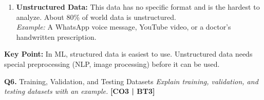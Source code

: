 \documentclass[12pt,a4paper]{article}
\newcommand{\Qno}[1]{\textbf{\color{darkred}Q#1.}}
\newcommand{\term}[1]{\textbf{\color{headingcolor}#1}}
\begin{document}
\begin{answerenv}
\begin{enumerate}[leftmargin=1.8em, itemsep=4pt]
  \item \term{Unstructured Data:} This data has no specific format and is the hardest to analyze. About 80\% of world data is unstructured.\\
  \textit{Example:} A WhatsApp voice message, YouTube video, or a doctor's handwritten prescription.
\end{enumerate}

\begin{keypoint}
\textbf{Key Point:} In ML, structured data is easiest to use. Unstructured data needs special preprocessing (NLP, image processing) before it can be used.
\end{keypoint}

\end{answerenv}

\vspace{8pt}

\begin{questionbox}{\Qno{6} Training, Validation, and Testing Datasets}
\textit{Explain training, validation, and testing datasets with an example.} \hfill \textbf{[CO3 | BT3]}
\end{questionbox}
\end{document}
